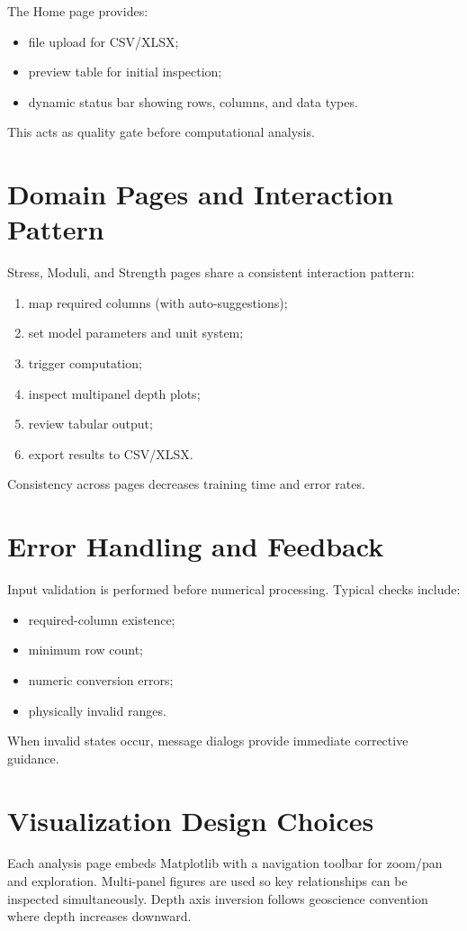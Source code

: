 \documentclass[12pt,a4paper]{report}
\begin{document}
The Home page provides:
\begin{itemize}
    \item file upload for CSV/XLSX;
    \item preview table for initial inspection;
    \item dynamic status bar showing rows, columns, and data types.
\end{itemize}

This acts as quality gate before computational analysis.

\section{Domain Pages and Interaction Pattern}
Stress, Moduli, and Strength pages share a consistent interaction pattern:
\begin{enumerate}
    \item map required columns (with auto-suggestions);
    \item set model parameters and unit system;
    \item trigger computation;
    \item inspect multipanel depth plots;
    \item review tabular output;
    \item export results to CSV/XLSX.
\end{enumerate}

Consistency across pages decreases training time and error rates.

\section{Error Handling and Feedback}
Input validation is performed before numerical processing. Typical checks include:
\begin{itemize}
    \item required-column existence;
    \item minimum row count;
    \item numeric conversion errors;
    \item physically invalid ranges.
\end{itemize}
When invalid states occur, message dialogs provide immediate corrective guidance.

\section{Visualization Design Choices}
Each analysis page embeds Matplotlib with a navigation toolbar for zoom/pan and exploration. Multi-panel figures are used so key relationships can be inspected simultaneously. Depth axis inversion follows geoscience convention where depth increases downward.
\end{document}
